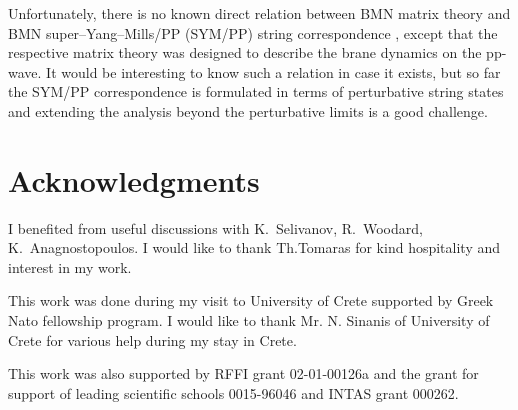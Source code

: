 \documentclass[a4paper]{article}
\begin{document}
Unfortunately, there is no known direct relation between BMN
matrix theory and BMN super--Yang--Mills/PP (SYM/PP) string
correspondence \cite{Berenstein:2002jq}, except that the
respective matrix theory was designed to describe the brane
dynamics on the pp-wave. It would be interesting to know such a
relation in case it exists, but so far the SYM/PP correspondence
is formulated in terms of perturbative string states and extending
the analysis beyond the perturbative limits is a good challenge.

\section*{Acknowledgments}
I benefited from useful discussions with K.~Selivanov, R.~Woodard,
K.~Anagnostopoulos. I would like to thank Th.Tomaras for kind
hospitality and interest in my work.

This work was done during my visit to University of Crete
supported by Greek Nato fellowship program. I would like to thank
Mr. N. Sinanis of University of Crete for various help during my
stay in Crete.

This work was also supported by RFFI grant
02-01-00126a and the grant for support of leading scientific schools
0015-96046 and INTAS grant 000262.
\end{document}
